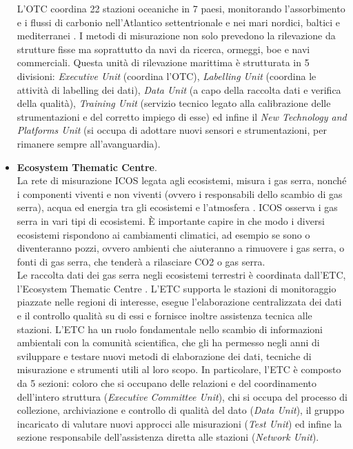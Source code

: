 \begin{itemize}
    L'OTC coordina 22 stazioni oceaniche in 7 paesi, monitorando
    l'assorbimento e i flussi di carbonio nell'Atlantico settentrionale
    e nei mari nordici, baltici e mediterranei \cite{ICOSOceanThematicCentre}.
    I metodi di misurazione non solo prevedono la rilevazione da strutture
    fisse ma
    soprattutto da navi da ricerca,
    ormeggi, boe e navi commerciali. Questa unità di rilevazione
    marittima è strutturata in 5 divisioni: 
    \textit{Executive Unit} (coordina l'OTC),
    \textit{Labelling Unit} (coordina le attività di
    labelling dei dati),
    \textit{Data Unit} (a capo della raccolta dati
    e verifica della qualità),
    \textit{Training Unit} (servizio tecnico legato
    alla calibrazione delle strumentazioni e del corretto
    impiego di esse) ed infine il
    \textit{New Technology and Platforms Unit} (si
    occupa di adottare nuovi sensori e strumentazioni,
    per rimanere sempre all'avanguardia).

    \item \textbf{Ecosystem Thematic Centre}.\\
    La rete di misurazione ICOS legata agli ecosistemi,
    misura i gas serra, nonché i componenti viventi
    e non viventi (ovvero i responsabili dello
    scambio di gas serra), acqua ed energia
    tra gli ecosistemi e l'atmosfera \cite{OceanObservationsICOS}. ICOS osserva
    i gas serra in vari tipi di ecosistemi.
    È importante capire in che modo i diversi
    ecosistemi rispondono ai cambiamenti climatici,
    ad esempio se sono o diventeranno pozzi, ovvero ambienti
    che aiuteranno a rimuovere i gas serra, o fonti
    di gas serra, che tenderà a rilasciare CO2 o gas serra.\\

    Le raccolta dati dei gas serra negli ecosistemi terrestri
    è coordinata dall'ETC, l'Ecosystem Thematic Centre \cite{ICOSEcosystemThematicCentre}.
    L'ETC supporta le stazioni di monitoraggio piazzate nelle regioni
    di interesse, esegue l'elaborazione centralizzata
    dei dati e il controllo qualità su di essi e fornisce inoltre
    assistenza tecnica alle stazioni.
    L'ETC ha un ruolo fondamentale nello scambio di
    informazioni ambientali
    con la comunità scientifica, che gli ha permesso negli anni di
    sviluppare e testare nuovi metodi di
    elaborazione dei dati,
    tecniche di misurazione e strumenti utili al loro scopo. In particolare,
    l'ETC è composto da 5 sezioni: coloro che si occupano delle relazioni
    e del coordinamento dell'intero struttura (\textit{Executive Committee Unit}),
    chi si occupa del processo di collezione, archiviazione e controllo di
    qualità del dato (\textit{Data Unit}), il gruppo incaricato
    di valutare nuovi approcci alle misurazioni (\textit{Test Unit})
    ed infine la sezione responsabile dell'assistenza diretta alle
    stazioni (\textit{Network Unit}).
   


\end{itemize}

